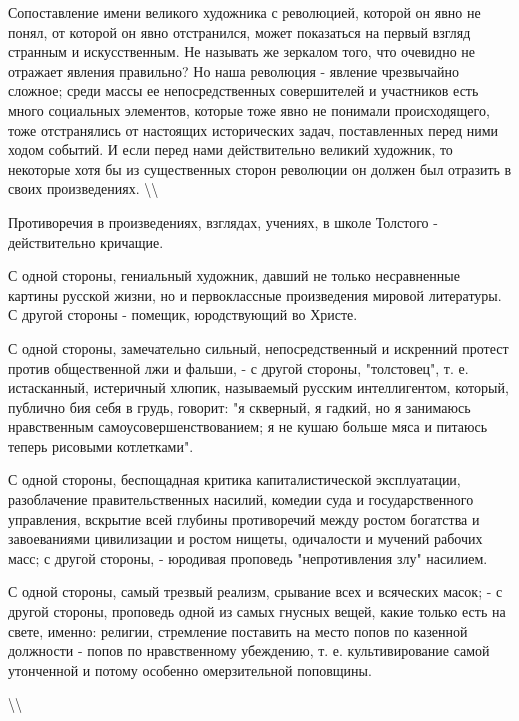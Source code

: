 \documentclass[12pt]{article}
\newcommand\ellipsis{%
  \textbackslash\thinspace\textellipsis\textbackslash
}
\newcommand{\parnum}{(\arabic{parcount})}
\newcounter{parcount}
\newenvironment{parnumbers}{%
  \par%
  \everypar{\noindent \stepcounter{parcount}\marginpar[]{\parnum}}%
}{}
\begin{document}
\begin{parnumbers}
Сопоставление имени великого художника с революцией, которой он явно не понял, от которой он явно отстранился, может показаться на первый взгляд странным и искусственным. Не называть же зеркалом того, что очевидно не отражает явления правильно? Но наша революция - явление чрезвычайно сложное; среди массы ее непосредственных совершителей и участников есть много социальных элементов, которые тоже явно не понимали происходящего, тоже отстранялись от настоящих исторических задач, поставленных перед ними ходом событий. И если перед нами действительно великий художник, то некоторые хотя бы из существенных сторон революции он должен был отразить в своих произведениях.\ellipsis

Противоречия в произведениях, взглядах, учениях, в школе Толстого - действительно кричащие.

С одной стороны, гениальный художник, давший не только несравненные картины русской жизни, но и первоклассные произведения мировой литературы. С другой стороны - помещик, юродствующий во Христе.

С одной стороны, замечательно сильный, непосредственный и искренний протест против общественной лжи и фальши, - с другой стороны, "толстовец", т. е. истасканный, истеричный хлюпик, называемый русским интеллигентом, который, публично бия себя в грудь, говорит: "я скверный, я гадкий, но я занимаюсь нравственным самоусовершенствованием; я не кушаю больше мяса и питаюсь теперь рисовыми котлетками".

С одной стороны, беспощадная критика капиталистической эксплуатации, разоблачение правительственных насилий, комедии суда и государственного управления, вскрытие всей глубины противоречий между ростом богатства и завоеваниями цивилизации и ростом нищеты, одичалости и мучений рабочих масс; с другой стороны, - юродивая проповедь "непротивления злу" насилием.

С одной стороны, самый трезвый реализм, срывание всех и всяческих масок; - с другой стороны, проповедь одной из самых гнусных вещей, какие только есть на свете, именно: религии, стремление поставить на место попов по казенной должности - попов по нравственному убеждению, т. е. культивирование самой утонченной и потому особенно омерзительной поповщины.
\end{parnumbers}

\ellipsis
\end{document}

